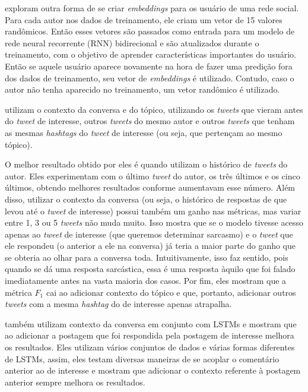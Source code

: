 \cite{kolchinski-potts:2018:representing-social-media-users} exploram outra
forma de se criar \textit{embeddings} para os usuário de uma rede social. Para
cada autor nos dados de treinamento, ele criam um vetor de 15 valores
randômicos. Então esses vetores são passados como entrada para um modelo de rede
neural recorrente (RNN) bidirecional e são atualizados durante o treinamento,
com o objetivo de aprender características importantes do usuário. Então se
aquele usuário aparece novamente na hora de fazer uma predição fora dos dados de
treinamento, seu vetor de \textit{embeddings} é utilizado. Contudo, caso o autor
não tenha aparecido no treinamento, um vetor randômico é utilizado.

\cite{wang-etal:2015:context-twitter} utilizam o contexto da conversa e do
tópico, utilizando os \textit{tweets} que vieram antes do \textit{tweet} de
interesse, outros \textit{tweets} do mesmo autor e outros \textit{tweets} que
tenham as mesmas \textit{hashtags} do \textit{tweet} de interesse (ou seja, que
pertençam ao mesmo tópico).

O melhor resultado obtido por eles é quando utilizam o histórico de
\textit{tweets} do autor. Eles experimentam com o último \textit{tweet} do
autor, os três últimos e os cinco últimos, obtendo melhores resultados conforme
aumentavam esse número. Além disso, utilizar o contexto da conversa (ou seja, o
histórico de respostas de que levou até o \textit{tweet} de interesse) possui
também um ganho nas métricas, mas variar entre 1, 3 ou 5 \textit{tweets} não
muda muito. Isso mostra que se o modelo tivesse acesso apenas ao \textit{tweet}
de interesse (que queremos determinar sarcasmo) e o \textit{tweet} que ele
respondeu (o anterior a ele na conversa) já teria a maior parte do ganho que
se obteria ao olhar para a conversa toda. Intuitivamente, isso faz sentido, pois
quando se dá uma resposta sarcástica, essa é uma resposta àquilo que foi falado
imediatamente antes na vasta maioria dos casos. Por fim, eles mostram que a
métrica $F_1$ cai ao adicionar contexto do tópico e que, portanto, adicionar
outros \textit{tweets} com a mesma \textit{hashtag} do de interesse apenas
atrapalha.

\cite{ghosh:2018:sarcasm-conversation-context} também utilizam contexto da
conversa em conjunto com LSTMs e mostram que ao adicionar a postagem que foi
respondida pela postagem de interesse melhora os resultados. Eles utilizam
vários conjuntos de dados e várias formas diferentes de LSTMs, assim, eles
testam diversas maneiras de se acoplar o comentário anterior ao de interesse e
mostram que adicionar o contexto referente à postagem anterior sempre melhora os
resultados.

